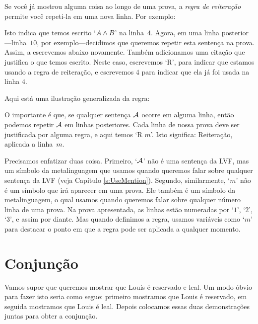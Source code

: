 Se voc\^e j\'a mostrou alguma coisa ao longo de uma prova, a  \emph{regra de  reitera\c c\~ao} permite voc\^e repeti-la em uma nova linha.  Por exemplo:
\begin{fitchproof}
	\have[$\vdots$]{}{\vdots}
	 
\end{fitchproof}
Isto indica que temos escrito `$A \wedge B$' na linha~$4$. Agora, em uma linha posterior---linha~$10$, por exemplo---decidimos que queremos repetir esta senten\c ca na prova. Assim, a escrevemos abaixo novamente.  Tamb\'em adicionamos uma cita\c c\~ao que justifica o que temos escrito. Neste caso, escrevemos  `R',  para indicar que estamos usando a regra de reitera\c c\~ao,  e escrevemos  $4$ para indicar  que ela j\'a foi usada na linha $4$.

 Aqui est\'a uma ilustra\c c\~ao generalizada da regra:

\begin{fitchproof}
	 
\end{fitchproof}
O importante \'e que, se qualquer senten\c ca $\mathcal{A}$ ocorre em alguma linha, ent\~ao podemos repetir $\mathcal{A}$ em linhas posteriores. Cada linha de nossa prova deve  ser justificada por alguma regra, e aqui temos `R $m$'.   Isto significa:  Reitera\c c\~ao, aplicada a linha~$m$. 

 Precisamos enfatizar duas coisa.  Primeiro,   `$\mathcal{A}$'   n\~ao   \'e uma senten\c ca da LVF,   mas um s\'imbolo da metalinguagem que usamos quando queremos falar sobre qualquer senten\c ca da LVF
 (veja Cap\'itulo \ref{s:UseMention}).   Segundo, similarmente,  `$m$'  n\~ao \'e um s\'imbolo que ir\'a aparecer em uma prova.  Ele tamb\'em \'e um s\'imbolo da metalinguagem, o qual usamos quando queremos falar sobre qualquer n\'umero linha  de uma prova. Na prova apresentada, as linhas  est\~ao numeradas por `$1$', `$2$', `$3$', e assim por diante.  Mas quando definimos a regra, usamos vari\'aveis como   `$m$' para destacar o ponto em que a regra pode ser aplicada a qualquer momento. 

\section{Conjun\c c\~ao}
  Vamos supor que queremos mostrar que Louis \'e reservado e leal. Um modo \'obvio para fazer isto seria como segue: primeiro mostramos que Louis \'e reservado, em seguida mostramos que Louis \'e leal. Depois colocamos essas duas demonstra\c c\~oes juntas para obter a conjun\c c\~ao.

